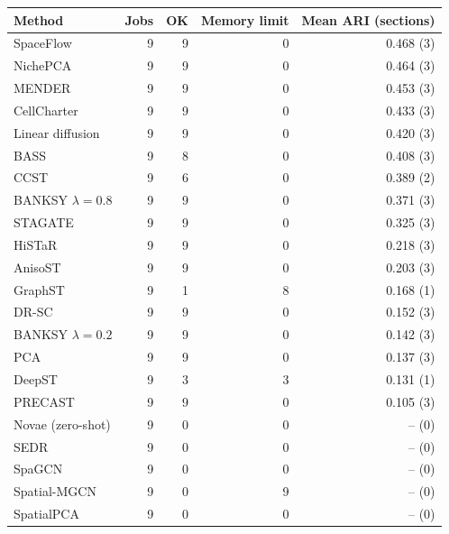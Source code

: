 \begin{tabular}{lrrrr}\toprule
Method & Jobs & OK & Memory limit & Mean ARI (sections) \\\midrule
SpaceFlow & 9 & 9 & 0 & 0.468 (3) \\
NichePCA & 9 & 9 & 0 & 0.464 (3) \\
MENDER & 9 & 9 & 0 & 0.453 (3) \\
CellCharter & 9 & 9 & 0 & 0.433 (3) \\
Linear diffusion & 9 & 9 & 0 & 0.420 (3) \\
BASS & 9 & 8 & 0 & 0.408 (3) \\
CCST & 9 & 6 & 0 & 0.389 (2) \\
BANKSY $\lambda=0.8$ & 9 & 9 & 0 & 0.371 (3) \\
STAGATE & 9 & 9 & 0 & 0.325 (3) \\
HiSTaR & 9 & 9 & 0 & 0.218 (3) \\
AnisoST & 9 & 9 & 0 & 0.203 (3) \\
GraphST & 9 & 1 & 8 & 0.168 (1) \\
DR-SC & 9 & 9 & 0 & 0.152 (3) \\
BANKSY $\lambda=0.2$ & 9 & 9 & 0 & 0.142 (3) \\
PCA & 9 & 9 & 0 & 0.137 (3) \\
DeepST & 9 & 3 & 3 & 0.131 (1) \\
PRECAST & 9 & 9 & 0 & 0.105 (3) \\
Novae (zero-shot) & 9 & 0 & 0 & -- (0) \\
SEDR & 9 & 0 & 0 & -- (0) \\
SpaGCN & 9 & 0 & 0 & -- (0) \\
Spatial-MGCN & 9 & 0 & 9 & -- (0) \\
SpatialPCA & 9 & 0 & 0 & -- (0) \\
\bottomrule\end{tabular}
